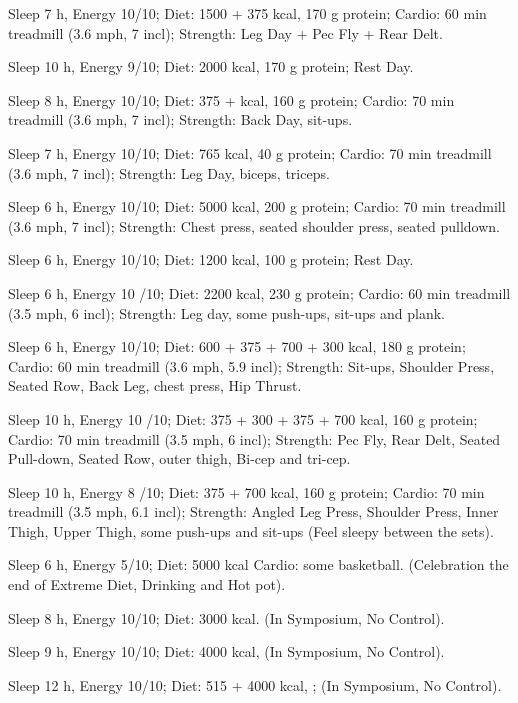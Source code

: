 
\item [Oct 29] Sleep 7 h, Energy 10/10; Diet: 1500 + 375 kcal, 170 g protein; Cardio: 60 min treadmill (3.6 mph, 7 incl); Strength: Leg Day + Pec Fly + Rear Delt.
\item [Oct 28] Sleep 10 h, Energy 9/10; Diet: 2000 kcal, 170 g protein; Rest Day.
\item [Oct 27] Sleep 8 h, Energy 10/10; Diet: 375 + kcal, 160 g protein; Cardio: 70 min treadmill (3.6 mph, 7 incl); Strength: Back Day, sit-ups.
\item [Oct 26] Sleep 7 h, Energy 10/10; Diet: 765 kcal, 40 g protein; Cardio: 70 min treadmill (3.6 mph, 7 incl); Strength: Leg Day, biceps, triceps.
\item [Oct 25] Sleep 6 h, Energy 10/10; Diet: 5000 kcal, 200 g protein; Cardio: 70 min treadmill (3.6 mph, 7 incl); Strength: Chest press, seated shoulder press, seated pulldown.
\item [Oct 24] Sleep 6 h, Energy 10/10; Diet: 1200 kcal, 100 g protein; Rest Day.
\item [Oct 23] Sleep 6 h, Energy 10 /10; Diet: 2200 kcal, 230 g protein; Cardio: 60 min treadmill (3.5 mph, 6 incl); Strength: Leg day, some push-ups, sit-ups and plank.
\item [Oct 22] Sleep 6 h, Energy 10/10; Diet: 600 + 375 + 700 + 300 kcal, 180 g protein; Cardio: 60 min treadmill (3.6 mph, 5.9 incl); Strength: Sit-ups, Shoulder Press, Seated Row, Back Leg, chest press, Hip Thrust.
\item [Oct 21] Sleep 10 h, Energy 10 /10; Diet: 375 + 300 + 375 + 700 kcal, 160 g protein; Cardio: 70 min treadmill (3.5 mph, 6 incl); Strength: Pec Fly, Rear Delt, Seated Pull-down, Seated Row, outer thigh, Bi-cep and tri-cep.
\item [Oct 20] Sleep 10 h, Energy 8 /10; Diet: 375 + 700 kcal, 160 g protein; Cardio: 70 min treadmill (3.5 mph, 6.1 incl); Strength: Angled Leg Press, Shoulder Press, Inner Thigh, Upper Thigh, some push-ups and sit-ups (Feel sleepy between the sets).
\item [Oct 19] Sleep 6 h, Energy 5/10; Diet: 5000 kcal Cardio: some basketball. (Celebration the end of Extreme Diet, Drinking and Hot pot).
\item [Oct 18] Sleep 8 h, Energy 10/10; Diet: 3000 kcal. (In Symposium, No Control).
\item [Oct 17] Sleep 9 h, Energy 10/10; Diet: 4000 kcal, (In Symposium, No Control).
\item [Oct 16] Sleep 12 h, Energy 10/10; Diet: 515 + 4000 kcal, ; (In Symposium, No Control).
